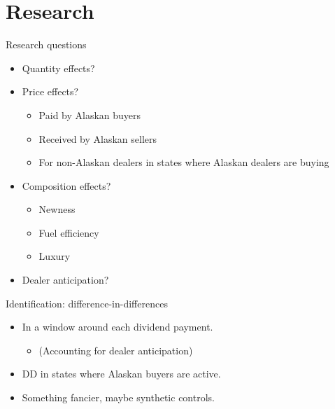 \documentclass[aspectratio=169]{beamer}
\begin{document}
\section{Research}
\begin{frame}{Research questions}
	\begin{itemize}
		\item Quantity effects?
		\item Price effects?
		\begin{itemize}
			\item Paid by Alaskan buyers
			\item Received by Alaskan sellers
			\item For non-Alaskan dealers in states where Alaskan dealers are buying
		\end{itemize}
		\item Composition effects?
		\begin{itemize}
			\item Newness
			\item Fuel efficiency
			\item Luxury
		\end{itemize}
		\item Dealer anticipation?
	\end{itemize}
\end{frame}
\begin{frame}{Identification: difference-in-differences}
	\begin{itemize}
		\item In a window around each dividend payment.
		\begin{itemize}
			\item (Accounting for dealer anticipation)
		\end{itemize}
		\item DD in states where Alaskan buyers are active.
		\item Something fancier, maybe synthetic controls.
	\end{itemize}
\end{frame}
\end{document}
